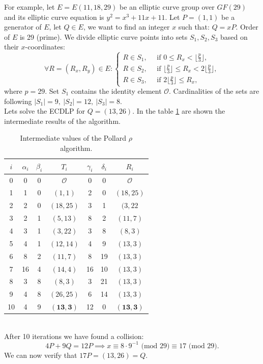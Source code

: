 \documentclass[thesis=M,english]{FITthesis}[2012/10/20]
\theoremstyle{remark}
\theoremstyle{definition}
\begin{document}
\noindent For example, let $E = E(11,18,29)$ be an elliptic curve group over $GF(29)$ and its elliptic curve equation is $y^2 = x^3 + 11x + 11$. Let $P = (1,1)$ be a generator of $E$, let $Q \in E$, we want to find an integer $x$ such that: $Q = xP.$
Order of $E$ is 29 (prime). We divide elliptic curve points into sets $S_1,S_2,S_3$ based on their $x$-coordinates:
$$
\forall R = (R_x, R_y) \in E: \begin{cases} R \in S_1, \quad \text{ if } 0\leq R_x < \big\lfloor\frac{p}{3}\big\rfloor, \\ 
R \in S_2, \quad \text{ if } \big\lfloor\frac{p}{3}\big\rfloor \leq R_x < 2\big\lfloor\frac{p}{3}\big\rfloor, \\
R \in S_3, \quad \text{ if } 2\big\lfloor\frac{p}{3}\big\rfloor \leq R_x, 
\end{cases}
$$ where $p = 29.$ 
Set $S_1$ contains the identity element $\mathcal{O}$. Cardinalities of the sets are following $|S_1| = 9,\ |S_2| = 12, \ |S_3| = 8.$ \\
Lets solve the ECDLP for $Q=(13,26)$. In the table \ref{tblRho} are shown the intermediate results of the algorithm.
\begin{table}[!h]
\centering
\begin{tabular}{ |c||c|c|c|c|c|c| } 
\hline
$i$ & $\alpha_i$ & $\beta_i$ & $T_i$ & $\gamma_i$ & $\delta_i$ & $R_i$ \\ 
\hline
\hline
0 & 0 & 0 & $\mathcal{O}$ &  0 & 0 & $\mathcal{O}$ \\ \hline
1 & 1 & 0 & $(1,1)$ &  2 & 0 & $(18,25)$ \\ \hline
2 & 2 & 0 & $(18,25)$ &  3 & 1 & $(3,22$ \\ \hline
3 & 2 & 1 & $(5,13)$ &  8 & 2 & $(11,7)$ \\ \hline
4 & 3 & 1 & $(3,22)$ &  3 & 8 & $(8,3)$ \\ \hline
5 & 4 & 1 & $(12,14)$ &  4 & 9 & $(13,3)$ \\ \hline
6 & 8 & 2 & $(11,7)$ &  8 & 19 & $(13,3)$ \\ \hline
7 & 16 & 4 & $(14,4)$ &  16 & 10 & $(13,3)$ \\ \hline
8 & 3 & 8 & $(8,3)$ &  3 & 21 & $(13,3)$ \\ \hline
9 & 4 & 8 & $(26,25)$ &  6 & 14 & $(13,3)$ \\ \hline
10 & 4 & 9 & $\mathbf{(13,3)}$ &  12 & 0 & $\mathbf{(13,3)}$ \\ \hline
\end{tabular}
\caption{Intermediate values of the Pollard $\rho$ algorithm.}
\label{tblRho}
\end{table}
\\
\noindent After 10 iterations we have found a collision: 
$$
4P + 9Q = 12P \implies x \equiv 8\cdot9^{-1} \text{ (mod $29$)} \equiv 17 \text{ (mod $29$)}. 
$$
We can now verify that $17P = (13,26) = Q.$
\end{document}
